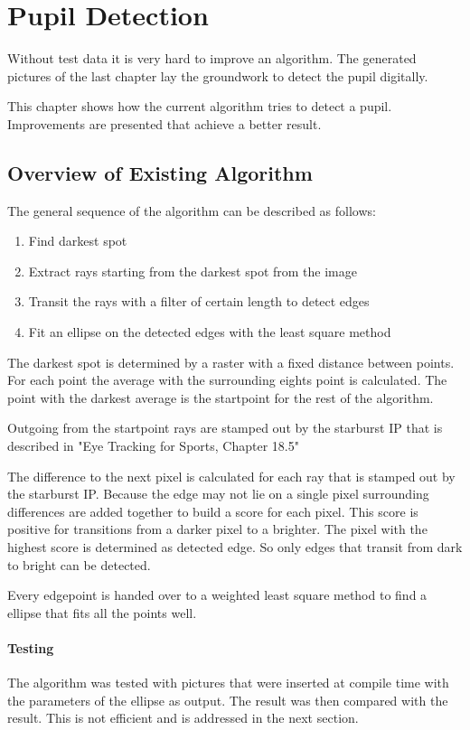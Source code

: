 \chapter{Pupil Detection}
\label{chap:pupildetection}
 Without test data it is very hard to improve an algorithm. The generated pictures of the last chapter lay the groundwork to detect the pupil digitally.
 
 This chapter shows how the current algorithm tries to detect a pupil. Improvements are presented that achieve a better result. 
\section{Overview of Existing Algorithm}
The general sequence of the algorithm can be described as follows:
\begin{enumerate}
	\item Find darkest spot
	\item Extract rays  starting from the darkest spot from the image
	\item Transit the rays with a filter of certain length to detect edges
	\item Fit an ellipse on the detected edges with the least square method
\end{enumerate}
The darkest spot is determined by a raster with a fixed distance between points. For each point the average with the surrounding eights point is calculated. The point with the darkest average is the startpoint for the rest of the algorithm.

Outgoing from the startpoint rays are stamped out by the starburst IP that is described in "Eye Tracking for Sports, Chapter 18.5" 

The difference to the next pixel is calculated for each ray that is stamped out by the starburst IP. Because the edge may not lie on a single pixel surrounding differences are added together to build a score for each pixel. This score is positive for transitions from a darker pixel to a brighter. The pixel with the highest score is determined as detected edge. So only edges that transit from dark to bright can be detected.

Every edgepoint is handed over to a weighted least square method to find a ellipse that fits all the points well.
\subsubsection{Testing}
The algorithm was tested with pictures that were inserted at compile time with the parameters of the ellipse as output. The result was then compared with the result. This is not efficient and is addressed in the next section.
